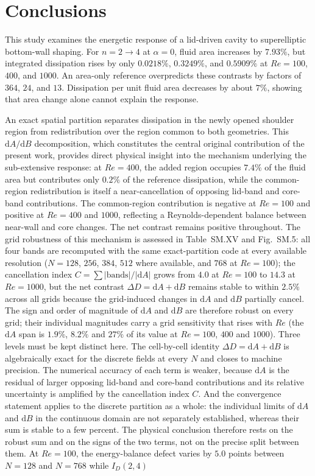 \section{Conclusions}
\label{sec:conclusions}

This study examines the energetic response of a lid-driven cavity to superelliptic bottom-wall shaping. For $n=2\to4$ at $\alpha=0$, fluid area increases by $7.93\%$, but integrated dissipation rises by only $0.0218\%$, $0.3249\%$, and $0.5909\%$ at $Re=100$, $400$, and $1000$. An area-only reference overpredicts these contrasts by factors of $364$, $24$, and $13$. Dissipation per unit fluid area decreases by about $7\%$, showing that area change alone cannot explain the response.

An exact spatial partition separates dissipation in the newly opened shoulder region from redistribution over the region common to both geometries. This $\mathrm{d}A/\mathrm{d}B$ decomposition, which constitutes the central original contribution of the present work, provides direct physical insight into the mechanism underlying the sub-extensive response: at $Re=400$, the added region occupies $7.4\%$ of the fluid area but contributes only $0.2\%$ of the reference dissipation, while the common-region redistribution is itself a near-cancellation of opposing lid-band and core-band contributions. The common-region contribution is negative at $Re=100$ and positive at $Re=400$ and $1000$, reflecting a Reynolds-dependent balance between near-wall and core changes. The net contrast remains positive throughout. The grid robustness of this mechanism is assessed in Table~SM.XV and Fig.~SM.5: all four bands are recomputed with the same exact-partition code at every available resolution ($N=128$, $256$, $384$, $512$ where available, and $768$ at $Re=100$); the cancellation index $C=\sum|\text{bands}|/|\mathrm{d}A|$ grows from $4.0$ at $Re=100$ to $14.3$ at $Re=1000$, but the net contrast $\Delta D=\mathrm{d}A+\mathrm{d}B$ remains stable to within $2.5\%$ across all grids because the grid-induced changes in $\mathrm{d}A$ and $\mathrm{d}B$ partially cancel. The sign and order of magnitude of $\mathrm{d}A$ and $\mathrm{d}B$ are therefore robust on every grid; their individual magnitudes carry a grid sensitivity that rises with $Re$ (the $\mathrm{d}A$ span is $1.9\%$, $8.2\%$ and $27\%$ of its value at $Re=100$, $400$ and $1000$). Three levels must be kept distinct here. The cell-by-cell identity $\Delta D=\mathrm{d}A+\mathrm{d}B$ is algebraically exact for the discrete fields at every $N$ and closes to machine precision. The numerical accuracy of each term is weaker, because $\mathrm{d}A$ is the residual of larger opposing lid-band and core-band contributions and its relative uncertainty is amplified by the cancellation index $C$. And the convergence statement applies to the discrete partition as a whole: the individual limits of $\mathrm{d}A$ and $\mathrm{d}B$ in the continuous domain are not separately established, whereas their sum is stable to a few percent. The physical conclusion therefore rests on the robust sum and on the signs of the two terms, not on the precise split between them. At $Re=100$, the energy-balance defect varies by $5.0$ points between $N=128$ and $N=768$ while $I_D(2,4)$ 